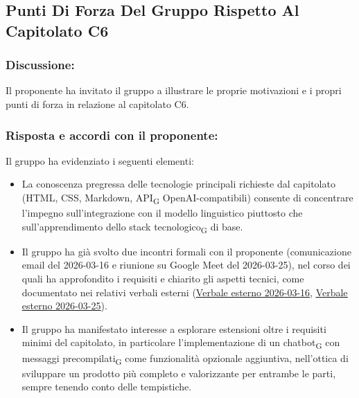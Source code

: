 \subsection{Punti Di Forza Del Gruppo Rispetto Al Capitolato C6}
 
\subsubsection*{Discussione:}
Il proponente ha invitato il gruppo a illustrare le proprie motivazioni e
i propri punti di forza in relazione al capitolato C6.
 
\subsubsection*{Risposta e accordi con il proponente:}
 
Il gruppo ha evidenziato i seguenti elementi:
 
\begin{itemize}
    \item La conoscenza pregressa delle tecnologie principali richieste
          dal capitolato (HTML, CSS, Markdown, API\textsubscript{G} OpenAI-compatibili) consente
          di concentrare l'impegno sull'integrazione con il modello linguistico
          piuttosto che sull'apprendimento dello stack tecnologico\textsubscript{G} di base.
    \item Il gruppo ha già svolto due incontri formali con il proponente
          (comunicazione email del 2026-03-16 e riunione su Google Meet del
          2026-03-25), nel corso dei quali ha approfondito i requisiti e chiarito
          gli aspetti tecnici, come documentato nei relativi verbali esterni (\href{https://synergo-unit-unipd.github.io/Second-Brain/docs/CC/doc_gestionali/verb_esterni/verb_est_2026_03_16_zucchetti/verb_est_2026_03_16_zucchetti.pdf}{\underline{Verbale esterno 2026-03-16}}, \href{https://synergo-unit-unipd.github.io/Second-Brain/docs/CC/doc_gestionali/verb_esterni/verb_est_2026_03_25_zucchetti/verb_est_2026_03_25_zucchetti.pdf}{\underline{Verbale esterno 2026-03-25}}).
    \item Il gruppo ha manifestato interesse a esplorare estensioni oltre i
          requisiti minimi del capitolato, in particolare l'implementazione di
          un chatbot\textsubscript{G} con messaggi precompilati\textsubscript{G} come funzionalità opzionale
          aggiuntiva, nell'ottica di sviluppare un prodotto più completo e
          valorizzante per entrambe le parti, sempre tenendo conto delle tempistiche.
\end{itemize}
 
